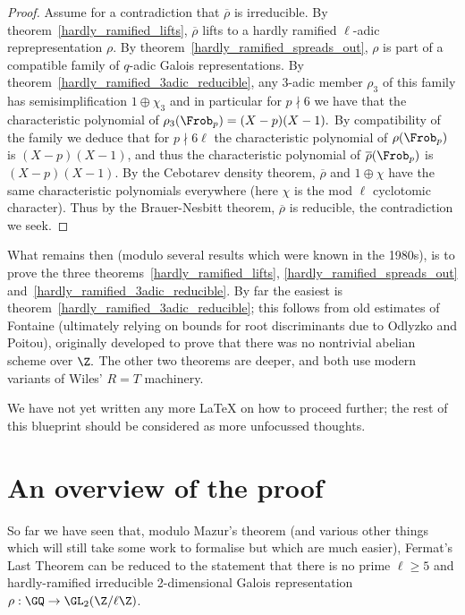 \begin{proof}
  Assume for a contradiction that $\overline{\rho}$ is irreducible. By theorem~\ref{hardly_ramified_lifts},
  $\overline{\rho}$ lifts to a hardly ramified $\ell$-adic reprepresentation $\rho$. By
  theorem~\ref{hardly_ramified_spreads_out}, $\rho$ is part of a compatible family of
  $q$-adic Galois representations. By theorem~\ref{hardly_ramified_3adic_reducible},
  any 3-adic member $\rho_3$ of this family has semisimplification $1\oplus\chi_3$ and in particular
  for $p\nmid 6$ we have that the characteristic polynomial of $\rho_3(\Frob_p)=(X-p)(X-1).$
  By compatibility of the family we deduce that for $p\nmid 6\ell$ the characteristic
  polynomial of $\rho(\Frob_p)$ is $(X-p)(X-1)$, and thus the characteristic polynomial
  of $\overline{\rho}(\Frob_p)$ is $(X-p)(X-1)$. By the Cebotarev density theorem,
  $\overline{\rho}$ and $1\oplus\chi$ have the same characteristic polynomials everywhere
  (here $\chi$ is the mod $\ell$ cyclotomic character). Thus by the Brauer-Nesbitt theorem,
  $\overline{\rho}$ is reducible, the contradiction we seek.
\end{proof}

What remains then (modulo several results which were known in the 1980s),
is to prove the three theorems~\ref{hardly_ramified_lifts},
\ref{hardly_ramified_spreads_out} and~\ref{hardly_ramified_3adic_reducible}.
By far the easiest is theorem~\ref{hardly_ramified_3adic_reducible}; this follows
from old estimates of Fontaine (ultimately relying on bounds for root discriminants due to
Odlyzko and Poitou), originally developed to prove that there was no
nontrivial abelian scheme over $\Z.$ The other two theorems are deeper, and both use
modern variants of Wiles' $R=T$ machinery.

We have not yet written any more LaTeX on how to proceed further; the rest of
this blueprint should be considered as more unfocussed thoughts.


\chapter{An overview of the proof}\label{ch_overview}

So far we have seen that, modulo Mazur's theorem (and various other things which will still take some work to formalise but which are much easier), Fermat's Last Theorem can be reduced
to the statement that there is no prime $\ell\geq 5$ and hardly-ramified
irreducible 2-dimensional Galois representation $\rho:\GQ\to\GL_2(\Z/\ell\Z)$.

